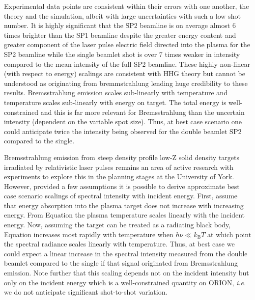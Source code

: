 Experimental data points are consistent within their errors with one another, the theory and the simulation, albeit with large uncertainties with such a low shot number. It is highly significant that the SP2 beamline is on average almost 6 times brighter than the SP1 beamline despite the greater energy content and greater component of the laser pulse electric field directed into the plasma for the SP2 beamline while the single beamlet shot is over 7 times weaker in intensity compared to the mean intensity of the full SP2 beamline. These highly non-linear (with respect to energy) scalings are consistent with HHG theory but cannot be understood as originating from bremmstrahlung lending huge credibility to these results. Bremsstrahlung emission scales sub-linearly with temperature and temperature scales sub-linearly with energy on target. The total energy is well-constrained and this is far more relevant for Bremsstrahlung than the uncertain intensity (dependent on the variable spot size). Thus, at best case scenario one could anticipate twice the intensity being observed for the double beamlet SP2 compared to the single.





Bremsstrahlung emission from steep density profile low-Z solid density targets irradiated by relativistic laser pulses remains an area of active research with experiments to explore this in the planning stages at the University of York. However, provided a few assumptions it is possible to derive approximate best case scenario scalings of spectral intensity with incident energy. First, assume that energy absorption into the plasma target does not increase with increasing energy. From Equation
the plasma temperature scales linearly with the incident energy. Now, assuming the target can be treated as a radiating black body, Equation 
increases most rapidly with temperature when $h\nu \ll k_\mathrm{B}T$ at which point the spectral radiance scales linearly with temperature. Thus, at best case we could expect a linear increase in the spectral intensity measured from the double beamlet compared to the single if that signal originated from Bremsstrahlung emission. Note further that this scaling depends not on the incident intensity but only on the incident energy which is a well-constrained quantity on ORION, \textit{i.e.} we do not anticipate significant shot-to-shot variation.

